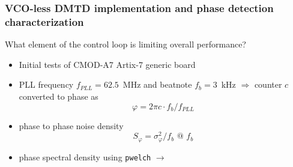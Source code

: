 \documentclass[compress,10pt,aspectratio=169]{beamer}
\begin{document}
\begin{frame}[fragile]
\begin{minipage}[t]{\linewidth}
\begin{minipage}{.49\linewidth}
\end{minipage}
\end{minipage}
\end{frame}






\begin{frame}[fragile]\frametitle{VCO-less DMTD implementation and phase detection characterization}

What element of the control loop is limiting overall performance?

\vspace{0.3cm}
\begin{minipage}[t]{1.06\linewidth}
\begin{minipage}{.49\linewidth}


\begin{itemize}
\item Initial tests of CMOD-A7 Artix-7 generic board
\item PLL frequency $f_{PLL}=62.5$~MHz and beatnote $f_b=3$~kHz $\Rightarrow$ counter $c$ converted
to phase as $$\varphi=2\pi c\cdot f_b/f_{PLL}$$
\item phase to phase noise density $$S_\varphi=\sigma^2_\varphi/f_b\mbox{ @ }f_b$$
\item phase spectral density using {\tt pwelch} $\longrightarrow$
\end{itemize}
\end{minipage}
\begin{minipage}{.49\linewidth}
\vspace{0.6cm}


\end{minipage}
\end{minipage}
\end{frame}
\end{document}
